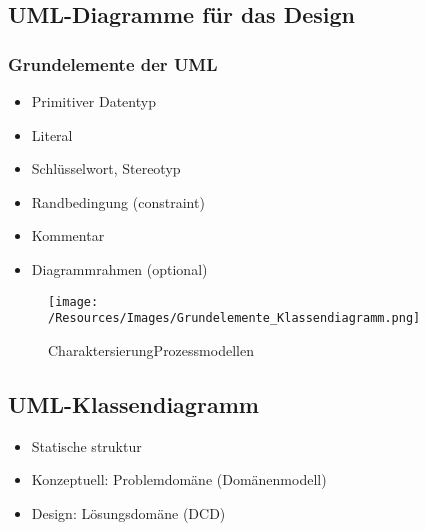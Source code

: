 \documentclass[../ZF_SWEN1.tex]{subfiles}
\begin{document}
\subsection{UML-Diagramme für das Design}
\subsubsection{Grundelemente der UML}
\begin{itemize}
	\item Primitiver Datentyp
	\item Literal
	\item Schlüsselwort, Stereotyp
	\item Randbedingung (constraint)
	\item Kommentar
	\item Diagrammrahmen (optional)
\end{itemize}

\begin{figure}[H]
\centering
\texttt{[image: /Resources/Images/Grundelemente\_Klassendiagramm.png]}
\caption{\label{fig:CharaktersierungProzessmodellen}CharaktersierungProzessmodellen}
\end{figure}

\subsection{UML-Klassendiagramm}
\begin{itemize}
	\item Statische struktur
	\item Konzeptuell: Problemdomäne (Domänenmodell)
	\item Design: Lösungsdomäne (DCD)
\end{itemize}
\end{document}
